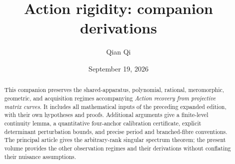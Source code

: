 \documentclass[11pt,reqno]{amsart}
\title[Action rigidity: companion derivations]{Action rigidity: companion derivations}
\author{Qian Qi}
\date{September 19, 2026}
\numberwithin{equation}{section}
\theoremstyle{definition}\newtheorem{definition}[theorem]{Definition}
\theoremstyle{remark}\newtheorem{remark}[theorem]{Remark}
\begin{document}
\begin{abstract}
This companion preserves the shared-apparatus, polynomial, rational,
meromorphic, geometric, and acquisition regimes accompanying
\emph{Action recovery from projective matrix curves}. It includes
all mathematical inputs of the preceding expanded edition, with their
own hypotheses and proofs. Additional arguments give a finite-level
continuity lemma, a quantitative four-anchor calibration certificate,
explicit determinant perturbation bounds, and precise period and
branched-fibre conventions. The principal article gives the arbitrary-rank
singular spectrum theorem; the present volume provides the other
observation regimes and their derivations without conflating their
nuisance assumptions.
\end{abstract}
\maketitle
\setcounter{tocdepth}{1}
\tableofcontents
\end{document}

